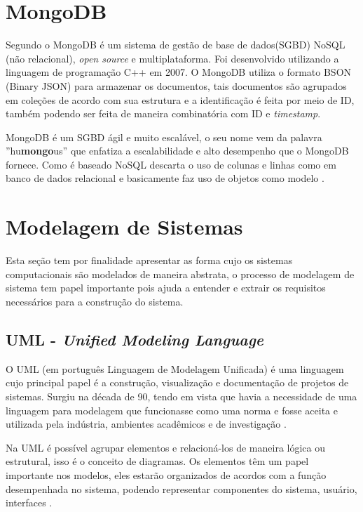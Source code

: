 \section{MongoDB} 
    Segundo \cite{mongodb} o MongoDB é um sistema de gestão de base de dados(SGBD) NoSQL (não relacional), \textit{open source} e multiplataforma. Foi desenvolvido utilizando a linguagem de programação C++ em 2007. O MongoDB utiliza o formato BSON (Binary JSON) para armazenar os documentos, tais documentos são agrupados em coleções de acordo com sua estrutura e a identificação é feita por meio de ID, também podendo ser feita de maneira combinatória com ID e \textit{timestamp}. 
    \par
    MongoDB é um SGBD ágil e muito escalável, o seu nome vem da palavra ''hu\textbf{mongo}us'' que enfatiza a escalabilidade e alto desempenho que o MongoDB fornece. Como é baseado NoSQL descarta o uso de colunas e linhas como em banco de dados relacional e basicamente faz uso de objetos como modelo \cite{dayley2014node}.
\section{Modelagem de Sistemas}
    Esta seção tem por finalidade apresentar as forma cujo os sistemas computacionais são modelados de maneira abstrata, o processo de modelagem de sistema tem papel importante pois ajuda a entender e extrair os requisitos necessários para a construção do sistema.
    \subsection{UML - \textit{Unified Modeling Language}}
    O UML (em português Linguagem de Modelagem Unificada) é uma linguagem cujo principal papel é a construção, visualização e documentação de projetos de sistemas. Surgiu na década de 90, tendo em vista que havia a necessidade de uma linguagem para modelagem que funcionasse como uma norma e fosse aceita e utilizada pela indústria, ambientes acadêmicos e de investigação \cite{uml}.
    \par
    Na UML é possível agrupar elementos e relacioná-los de maneira lógica ou estrutural, isso é o conceito de diagramas. Os elementos têm um papel importante nos modelos, eles estarão organizados de acordos com a função desempenhada no sistema, podendo representar componentes do sistema, usuário, interfaces \cite{uml}.
    
